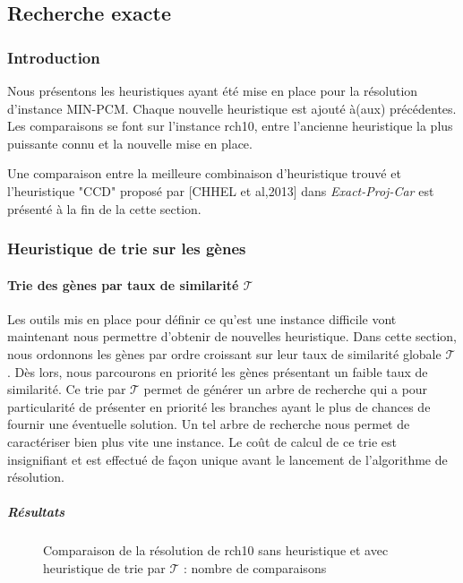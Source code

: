 \documentclass[a4paper,10pt]{article}
\begin{document}
\subsection{Recherche exacte}
\subsubsection{Introduction}
Nous présentons les heuristiques ayant été mise en place pour la résolution d'instance MIN-PCM. Chaque nouvelle heuristique est ajouté à(aux) précédentes. Les comparaisons se font sur l'instance rch10, entre l'ancienne heuristique la plus puissante connu et la nouvelle mise en place. 

Une comparaison entre la meilleure combinaison d'heuristique trouvé et l'heuristique "CCD" proposé par [CHHEL et al,2013] dans \textit{Exact-Proj-Car} est présenté à la fin de la cette section.

\subsubsection{Heuristique de trie sur les gènes }
\paragraph{Trie des gènes par taux de similarité $\mathcal{T}$}
Les outils mis en place pour définir ce qu'est une instance difficile vont maintenant nous permettre d'obtenir de nouvelles heuristique. Dans cette section, nous ordonnons les gènes par ordre croissant sur leur taux de similarité globale $\mathcal{T}$. Dès lors, nous parcourons en priorité les gènes présentant un faible taux de similarité. Ce trie par $\mathcal{T}$ permet de générer un arbre de recherche qui a pour particularité de présenter en priorité les branches ayant le plus de chances de fournir une éventuelle solution. Un tel arbre de recherche nous permet de caractériser bien plus vite une instance. Le coût de calcul de ce trie est insignifiant et est effectué de façon unique avant le lancement de l'algorithme de résolution.

\subparagraph{Résultats}

\begin{figure}[H]
\begin{center}
\end{center}
\caption{Comparaison de la résolution de rch10 sans heuristique et avec heuristique de trie par $\mathcal{T}$ : nombre de comparaisons}
\end{figure}
\end{document}

